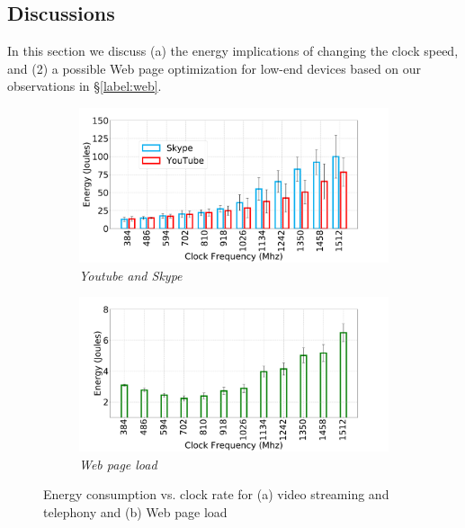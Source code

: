 \subsection{Discussions}
\label{sec:energy}

In this section we discuss (a) the energy implications of changing the clock speed, and (2) a possible Web page optimization for low-end devices based on our observations in \S\ref{label:web}.

%  

\begin{figure}
    \begin{subfigure}[b]{0.5\textwidth}
        \centering
        \includegraphics[width=1\linewidth]{sections/device-work/power-video}
    	 \caption{\textit{Youtube and Skype}}
    \end{subfigure}
    \begin{subfigure}[b]{0.5\textwidth}
        \centering
        \includegraphics[width=1\linewidth]{sections/device-work/power-plt}
   	\caption{\textit{Web page load}}
    \end{subfigure}
  \caption{Energy consumption vs. clock rate for (a) video streaming and telephony and (b) Web page load}
  \label{fig:power-video-web}
  \vspace{-0.15in}
\end{figure}

